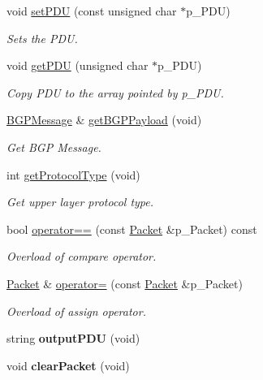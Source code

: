 \begin{DoxyCompactItemize}
void \hyperlink{classPacket_a49433148c75138f3057e46271ec2f8fc}{set\-P\-D\-U} (const unsigned char $\ast$p\-\_\-\-P\-D\-U)
\begin{DoxyCompactList}\small\item\em Sets the P\-D\-U. \end{DoxyCompactList}\item 
void \hyperlink{classPacket_a1b85389d4a39fdc6f261f09b08041e8d}{get\-P\-D\-U} (unsigned char $\ast$p\-\_\-\-P\-D\-U)
\begin{DoxyCompactList}\small\item\em Copy P\-D\-U to the array pointed by p\-\_\-\-P\-D\-U. \end{DoxyCompactList}\item 
\hyperlink{classBGPMessage}{B\-G\-P\-Message} \& \hyperlink{classPacket_a5e573f357e5f3805041f5f0048e4e228}{get\-B\-G\-P\-Payload} (void)
\begin{DoxyCompactList}\small\item\em Get B\-G\-P Message. \end{DoxyCompactList}\item 
int \hyperlink{classPacket_a8238b0ebe88dacd1977641538cdeeba3}{get\-Protocol\-Type} (void)
\begin{DoxyCompactList}\small\item\em Get upper layer protocol type. \end{DoxyCompactList}\item 
bool \hyperlink{classPacket_a1cc5dc6d64534c637a78fdc36e9f402c}{operator==} (const \hyperlink{classPacket}{Packet} \&p\-\_\-\-Packet) const 
\begin{DoxyCompactList}\small\item\em Overload of compare operator. \end{DoxyCompactList}\item 
\hyperlink{classPacket}{Packet} \& \hyperlink{classPacket_a43e76d516ec6d5ad389e0763943f7614}{operator=} (const \hyperlink{classPacket}{Packet} \&p\-\_\-\-Packet)
\begin{DoxyCompactList}\small\item\em Overload of assign operator. \end{DoxyCompactList}\item 
\hypertarget{classPacket_a62734b071034179836086a07d6d5f35d}{string {\bfseries output\-P\-D\-U} (void)}\label{classPacket_a62734b071034179836086a07d6d5f35d}

\item 
\hypertarget{classPacket_a1a07a62259534b5764044d62551a0d9a}{void {\bfseries clear\-Packet} (void)}\label{classPacket_a1a07a62259534b5764044d62551a0d9a}

\end{DoxyCompactItemize}
